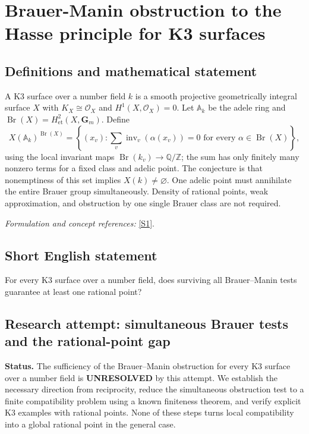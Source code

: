 \documentclass[11pt]{article}
\begin{document}
\section*{\texorpdfstring{Brauer-Manin obstruction to the Hasse principle for K3 surfaces}{Brauer-Manin obstruction to the Hasse principle for K3 surfaces}}\label{statement}
\subsection{Definitions and mathematical statement}
A K3 surface over a number field $k$ is a smooth projective geometrically integral surface $X$ with $K_X\cong\mathcal O_X$ and $H^1(X,\mathcal O_X)=0$. Let ${\mathbb{A}}_k$ be the adele ring and $\operatorname{Br}(X)=H^2_{\mathrm{et}}(X,\mathbf G_m)$. Define
\[
 X({\mathbb{A}}_k)^{\operatorname{Br}(X)}=
 \left\{(x_v):\sum_v\operatorname{inv}_v(\alpha(x_v))=0
 \text{ for every }\alpha\in\operatorname{Br}(X)\right\},
\]
using the local invariant maps $\operatorname{Br}(k_v)\to{\mathbb{Q}}/{\mathbb{Z}}$; the sum has only finitely many nonzero terms for a fixed class and adelic point. The conjecture is that nonemptiness of this set implies $X(k)\ne\varnothing$. One adelic point must annihilate the entire Brauer group simultaneously. Density of rational points, weak approximation, and obstruction by one single Brauer class are not required.
\par\smallskip\textit{Formulation and concept references:} \href{https://arxiv.org/html/2502.08723v1}{[S1]}.

\subsection{Short English statement}
For every K3 surface over a number field, does surviving all Brauer--Manin tests guarantee at least one rational point?
\subsection{Research attempt: simultaneous Brauer tests and the rational-point gap}
\textbf{Status.} The sufficiency of the Brauer--Manin obstruction for every K3 surface over a number field is \textbf{UNRESOLVED} by this attempt. We establish the necessary direction from reciprocity, reduce the simultaneous obstruction test to a finite compatibility problem using a known finiteness theorem, and verify explicit K3 examples with rational points. None of these steps turns local compatibility into a global rational point in the general case.
\end{document}
